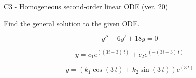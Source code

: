 \begin{exercise}
  \begin{exerciseTitle}C3 - Homogeneous second-order linear ODE (ver. 20)\end{exerciseTitle}
  \begin{exerciseStatement}
    
Find the general solution to the given ODE.

    
\[y''-6y'+18y = 0\]

  \end{exerciseStatement}
  \begin{exerciseAnswer}
    
\[y= c_{1} e^{\left(\left(3 i + 3\right) \, t\right)} + c_{2} e^{\left(-\left(3 i - 3\right) \, t\right)}\]

    
\[y= {\left(k_{1} \cos\left(3 \, t\right) + k_{2} \sin\left(3 \, t\right)\right)} e^{\left(3 \, t\right)}\]

  \end{exerciseAnswer}
\end{exercise}